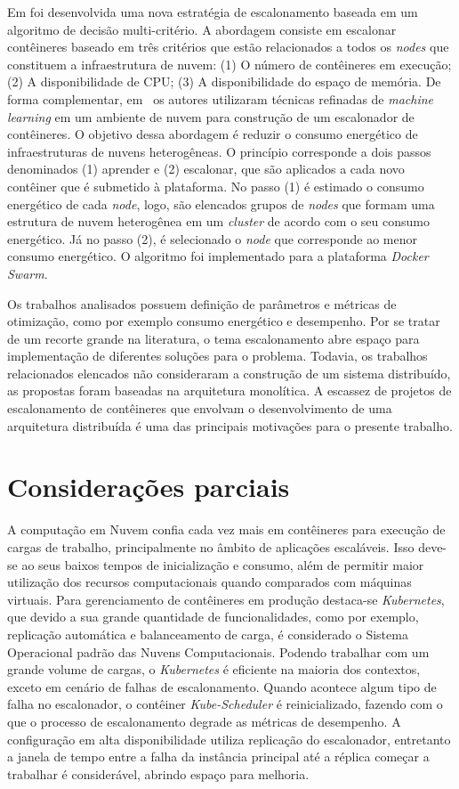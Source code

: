 Em  foi desenvolvida uma nova estratégia de escalonamento baseada em um algoritmo de decisão multi-critério. A abordagem consiste em escalonar contêineres baseado em três critérios que estão relacionados a todos os \textit{nodes}  que constituem a infraestrutura de nuvem: (1) O número de contêineres em execução; (2) A disponibilidade de CPU; (3) A disponibilidade do espaço de memória.
De forma complementar, em~ os autores utilizaram técnicas refinadas de \textit{machine learning} em um ambiente de nuvem para construção de um escalonador de contêineres. O objetivo dessa abordagem é reduzir o consumo energético de infraestruturas de nuvens heterogêneas. O princípio corresponde a dois passos denominados (1) aprender e (2) escalonar, que são aplicados a cada novo contêiner que é submetido à plataforma. No passo (1) é estimado o consumo energético de cada \textit{node}, logo, são elencados grupos de \textit{nodes} que formam uma estrutura de nuvem heterogênea em um \textit{cluster} de acordo com o seu consumo energético.
Já no passo (2), é selecionado o \textit{node} que corresponde  ao menor consumo energético. O algoritmo foi implementado para a plataforma \textit{Docker Swarm}.

Os trabalhos analisados possuem definição de parâmetros e métricas de otimização, como por exemplo consumo energético e desempenho. Por se tratar de um recorte grande na literatura, o tema escalonamento abre espaço para implementação de diferentes soluções para o problema. Todavia, os trabalhos relacionados elencados não consideraram a construção de um sistema distribuído, as propostas foram baseadas na arquitetura monolítica. A escassez de projetos de escalonamento de contêineres que envolvam o desenvolvimento de uma arquitetura distribuída é uma das principais motivações para o presente trabalho.

\section{Considerações parciais}

A computação em Nuvem confia cada vez mais em contêineres para execução de cargas de trabalho, principalmente no âmbito de aplicações escaláveis. Isso deve-se ao seus baixos tempos de inicialização e consumo, além de permitir maior utilização dos recursos computacionais quando comparados com máquinas virtuais. Para gerenciamento de contêineres em produção destaca-se \textit{Kubernetes}, que devido a sua grande quantidade de funcionalidades, como por exemplo, replicação automática e balanceamento de carga, é considerado o Sistema Operacional padrão das Nuvens Computacionais. Podendo trabalhar com um grande volume de cargas, o \textit{Kubernetes} é eficiente na maioria dos contextos, exceto em cenário de falhas de escalonamento. Quando acontece algum tipo de falha no escalonador, o contêiner \textit{Kube-Scheduler} é reinicializado, fazendo com o que o processo de escalonamento degrade as métricas de desempenho. A configuração em alta disponibilidade utiliza replicação do escalonador, entretanto a janela de tempo entre a falha da instância principal até a réplica começar a trabalhar é considerável, abrindo espaço para melhoria.

